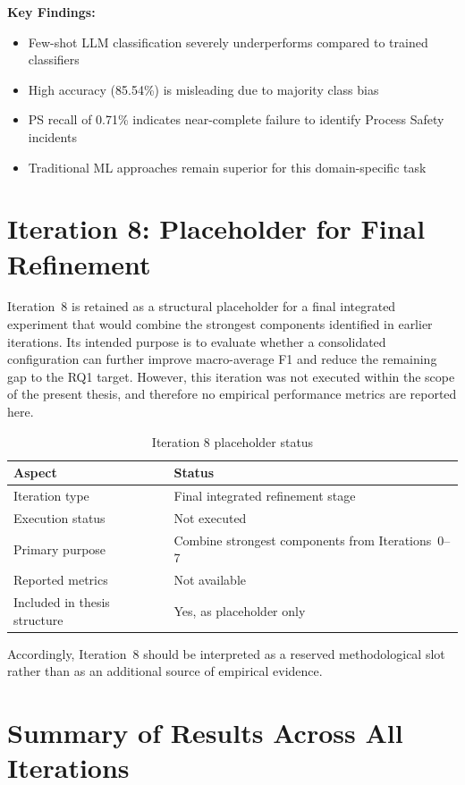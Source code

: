 \documentclass[11pt, titlepage, bibliography=totoc]{scrreprt}
\begin{document}
\textbf{Key Findings:}
\begin{itemize}
    \item Few-shot LLM classification severely underperforms compared to trained classifiers
    \item High accuracy (85.54\%) is misleading due to majority class bias
    \item PS recall of 0.71\% indicates near-complete failure to identify Process Safety incidents
    \item Traditional ML approaches remain superior for this domain-specific task
\end{itemize}

\section{Iteration 8: Placeholder for Final Refinement}

Iteration~8 is retained as a structural placeholder for a final integrated experiment that would combine the strongest components identified in earlier iterations. Its intended purpose is to evaluate whether a consolidated configuration can further improve macro-average F1 and reduce the remaining gap to the RQ1 target. However, this iteration was not executed within the scope of the present thesis, and therefore no empirical performance metrics are reported here.

\begin{table}[htbp]
\centering
\caption{Iteration 8 placeholder status}
\label{tab:results-iter8}
\begin{tabular}{@{}ll@{}}
\toprule
\textbf{Aspect} & \textbf{Status} \\
\midrule
Iteration type & Final integrated refinement stage \\
Execution status & Not executed \\
Primary purpose & Combine strongest components from Iterations~0--7 \\
Reported metrics & Not available \\
Included in thesis structure & Yes, as placeholder only \\
\bottomrule
\end{tabular}
\end{table}

Accordingly, Iteration~8 should be interpreted as a reserved methodological slot rather than as an additional source of empirical evidence.

\section{Summary of Results Across All Iterations}
\end{document}
